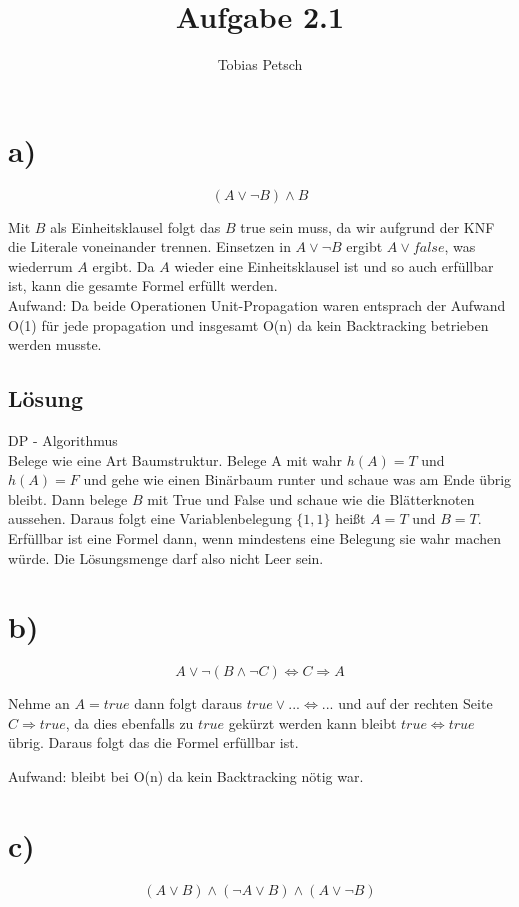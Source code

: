\documentclass[a4paper,12pt]{article}
\author{Tobias Petsch}
\title{Aufgabe 2.1}
\date{}
\begin{document}
\maketitle


\section*{a)}
\[
(A \lor \neg B) \land B
\]

Mit $B$ als Einheitsklausel folgt das $B$ true sein muss, da wir aufgrund der KNF die Literale
voneinander trennen. Einsetzen in $A \lor \neg B$ ergibt $A \lor false$, was wiederrum $A$ ergibt.
Da $A$ wieder eine Einheitsklausel ist und so auch erfüllbar ist, kann die gesamte Formel erfüllt werden. \\

Aufwand: Da beide Operationen Unit-Propagation waren entsprach der Aufwand O(1) für jede propagation und insgesamt
O(n) da kein Backtracking betrieben werden musste.


\subsection*{Lösung}
DP - Algorithmus \\
Belege wie eine Art Baumstruktur. Belege A mit wahr $h(A)=T$ und $h(A)=F$ und gehe wie einen Binärbaum runter und schaue was am Ende übrig bleibt.
Dann belege $B$ mit True und False und schaue wie die Blätterknoten aussehen. Daraus folgt eine Variablenbelegung $\{1,1\}$ heißt $A=T$ und $B=T$.
Erfüllbar ist eine Formel dann, wenn mindestens eine Belegung sie wahr machen würde. Die Lösungsmenge darf also nicht Leer sein.


\section*{b)}
\[
A \lor \neg (B \land \neg C) \Leftrightarrow C \Rightarrow A
\]

Nehme an $A = true$ dann folgt daraus $true \lor ... \Leftrightarrow ...$ und
auf der rechten Seite $C \Rightarrow true$, da dies ebenfalls zu $true$ gekürzt werden kann 
bleibt $true \Leftrightarrow true$ übrig. Daraus folgt das die Formel erfüllbar ist.

Aufwand: bleibt bei O(n) da kein Backtracking nötig war.

\section*{c)}
\[
(A \lor B) \land (\neg A \lor B) \land (A \lor \neg B)
\]
\end{document}
